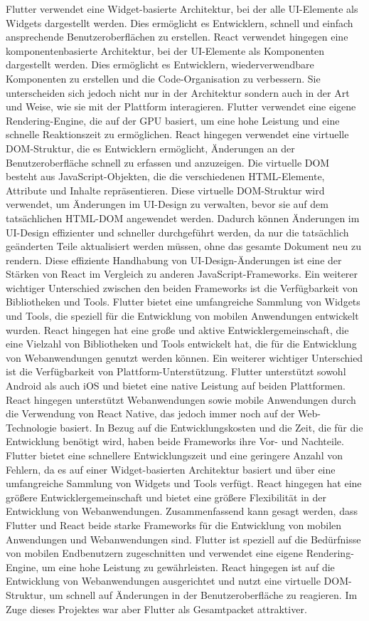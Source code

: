 Flutter verwendet eine Widget-basierte Architektur, bei der alle UI-Elemente als Widgets dargestellt werden. 
Dies ermöglicht es Entwicklern, schnell und einfach ansprechende Benutzeroberflächen zu erstellen. 
React verwendet hingegen eine komponentenbasierte Architektur, bei der UI-Elemente als Komponenten dargestellt werden.
Dies ermöglicht es Entwicklern, wiederverwendbare Komponenten zu erstellen und die Code-Organisation zu verbessern.
Sie unterscheiden sich jedoch nicht nur in der Architektur sondern auch in der Art und Weise, wie sie mit der Plattform interagieren. 
Flutter verwendet eine eigene Rendering-Engine, die auf der GPU basiert, um eine hohe Leistung und eine schnelle Reaktionszeit zu ermöglichen.
React hingegen verwendet eine virtuelle DOM-Struktur, die es Entwicklern ermöglicht, Änderungen an der Benutzeroberfläche schnell zu erfassen und anzuzeigen. 
Die virtuelle DOM besteht aus JavaScript-Objekten, die die verschiedenen HTML-Elemente, Attribute und Inhalte repräsentieren. 
Diese virtuelle DOM-Struktur wird verwendet, um Änderungen im UI-Design zu verwalten, bevor sie auf dem tatsächlichen HTML-DOM angewendet werden. 
Dadurch können Änderungen im UI-Design effizienter und schneller durchgeführt werden, da nur die tatsächlich geänderten Teile aktualisiert werden müssen, ohne das gesamte Dokument neu zu rendern. 
Diese effiziente Handhabung von UI-Design-Änderungen ist eine der Stärken von React im Vergleich zu anderen JavaScript-Frameworks.
Ein weiterer wichtiger Unterschied zwischen den beiden Frameworks ist die Verfügbarkeit von Bibliotheken und Tools. Flutter bietet eine umfangreiche Sammlung von Widgets und Tools, die speziell für die Entwicklung von mobilen Anwendungen entwickelt wurden. 
React hingegen hat eine große und aktive Entwicklergemeinschaft, die eine Vielzahl von Bibliotheken und Tools entwickelt hat, die für die Entwicklung von Webanwendungen genutzt werden können.
Ein weiterer wichtiger Unterschied ist die Verfügbarkeit von Plattform-Unterstützung. 
Flutter unterstützt sowohl Android als auch iOS und bietet eine native Leistung auf beiden Plattformen. 
React hingegen unterstützt Webanwendungen sowie mobile Anwendungen durch die Verwendung von React Native, das jedoch immer noch auf der Web-Technologie basiert.
In Bezug auf die Entwicklungskosten und die Zeit, die für die Entwicklung benötigt wird, haben beide Frameworks ihre Vor- und Nachteile. 
Flutter bietet eine schnellere Entwicklungszeit und eine geringere Anzahl von Fehlern, da es auf einer Widget-basierten Architektur basiert und über eine umfangreiche Sammlung von Widgets und Tools verfügt. 
React hingegen hat eine größere Entwicklergemeinschaft und bietet eine größere Flexibilität in der Entwicklung von Webanwendungen.
Zusammenfassend kann gesagt werden, dass Flutter und React beide starke Frameworks für die Entwicklung von mobilen Anwendungen und Webanwendungen sind. 
Flutter ist speziell auf die Bedürfnisse von mobilen Endbenutzern zugeschnitten und verwendet eine eigene Rendering-Engine, um eine hohe Leistung zu gewährleisten. 
React hingegen ist auf die Entwicklung von Webanwendungen ausgerichtet und nutzt eine virtuelle DOM-Struktur, um schnell auf Änderungen in der Benutzeroberfläche zu reagieren. 
Im Zuge dieses Projektes war aber Flutter als Gesamtpacket attraktiver.

